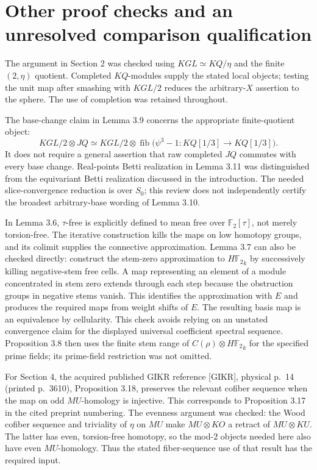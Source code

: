 \documentclass[10pt]{article}
\begin{document}
\section*{Other proof checks and an unresolved comparison qualification}
The argument in Section 2 was checked using \(KGL\simeq KQ/\eta\) and the finite \((2,\eta)\) quotient. Completed \(KQ\)-modules supply the stated local objects; testing the unit map after smashing with \(KGL/2\) reduces the arbitrary-\(X\) assertion to the sphere. The use of completion was retained throughout.\par
The base-change claim in Lemma 3.9 concerns the appropriate finite-quotient object: \[KGL/2\otimes JQ\simeq
 KGL/2\otimes\mathop{\mathrm{fib}}\bigl(\psi^3-1:
 KQ[1/3]\longrightarrow KQ[1/3]\bigr).\] It does not require a general assertion that raw completed \(JQ\) commutes with every base change. Real-points Betti realization in Lemma 3.11 was distinguished from the equivariant Betti realization discussed in the introduction. The needed slice-convergence reduction is over \(S_0\); this review does not independently certify the broadest arbitrary-base wording of Lemma 3.10.\par
In Lemma 3.6, \(\tau\)-free is explicitly defined to mean free over \(\mathbb F_2[\tau]\), not merely torsion-free. The iterative construction kills the maps on low homotopy groups, and its colimit supplies the connective approximation. Lemma 3.7 can also be checked directly: construct the stem-zero approximation to \({H\mathbb F_2}_k\) by successively killing negative-stem free cells. A map representing an element of a module concentrated in stem zero extends through each step because the obstruction groups in negative stems vanish. This identifies the approximation with \(E\) and produces the required maps from weight shifts of \(E\). The resulting basis map is an equivalence by cellularity. This check avoids relying on an unstated convergence claim for the displayed universal coefficient spectral sequence. Proposition 3.8 then uses the finite stem range of \(C(\rho)\otimes{H\mathbb F_2}_k\) for the specified prime fields; its prime-field restriction was not omitted.\par
For Section 4, the acquired published GIKR reference [GIKR], physical p. 14 (printed p. 3610), Proposition 3.18, preserves the relevant cofiber sequence when the map on odd \(MU\)-homology is injective. This corresponds to Proposition 3.17 in the cited preprint numbering. The evenness argument was checked: the Wood cofiber sequence and triviality of \(\eta\) on \(MU\) make \(MU\otimes KO\) a retract of \(MU\otimes KU\). The latter has even, torsion-free homotopy, so the mod-\(2\) objects needed here also have even \(MU\)-homology. Thus the stated fiber-sequence use of that result has the required input.\par
\end{document}
